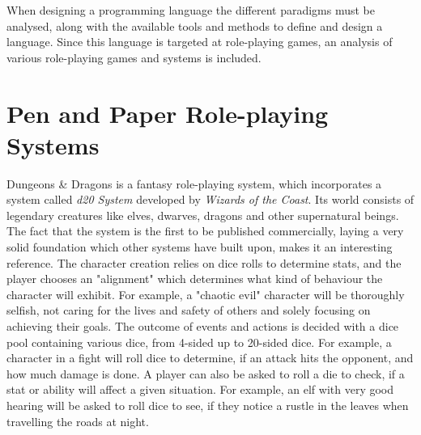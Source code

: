 When designing a programming language the different paradigms must be analysed, along with the available tools and methods to define and design a language. Since this language is targeted at role-playing games, an analysis of various role-playing games and systems is included.

\begin{comment}
\section{Analysis of Role-playing systems}

As mention the basic idea of a role-playing game is interactive story-telling. The game consists of several players and a \ac{gm}. The \ac{gm} is the mastermind behind the story being acted out, called the scenario. They are in charge of writing the plot of the scenario, and guiding the players through it, all the while allowing them to shape the individual encounters and scenes, but maintaining the greater story-arc. The players receive points for their characters surviving battles, using skills or sometimes as a reward to the player for excellent roleplaying of the character. Often dice are used to introduce randomness in determining the outcome of actions. The use of dice is incorporated into popular role-playing systems like Dungeons \& Dragons (DnD) and World of Darkness (WoD), both very popular pen and paper roleplaying systems.
\end{comment}

\section{Pen and Paper Role-playing Systems}

Dungeons \& Dragons is a fantasy role-playing system, which incorporates a system called \emph{d20 System} developed by \emph{Wizards of the Coast}.
Its world consists of legendary creatures like elves, dwarves, dragons and other supernatural beings. The fact that the system is the first to be published commercially, laying a very solid foundation which other systems have built upon, makes it an interesting reference. The character creation relies on dice rolls to determine stats, and the player chooses an "alignment" which determines what kind of behaviour the character will exhibit. For example, a "chaotic evil" character will be thoroughly selfish, not caring for the lives and safety of others and solely focusing on achieving their goals.
The outcome of events and actions is decided with a dice pool containing various dice, from 4-sided up to 20-sided dice. For example, a character in a fight will roll dice to determine, if an attack hits the opponent, and how much damage is done. A player can also be asked to roll a die to check, if a stat or ability will affect a given situation. For example, an elf with very good hearing will be asked to roll dice to see, if they notice a rustle in the leaves when travelling the roads at night.\cite{dnd}

